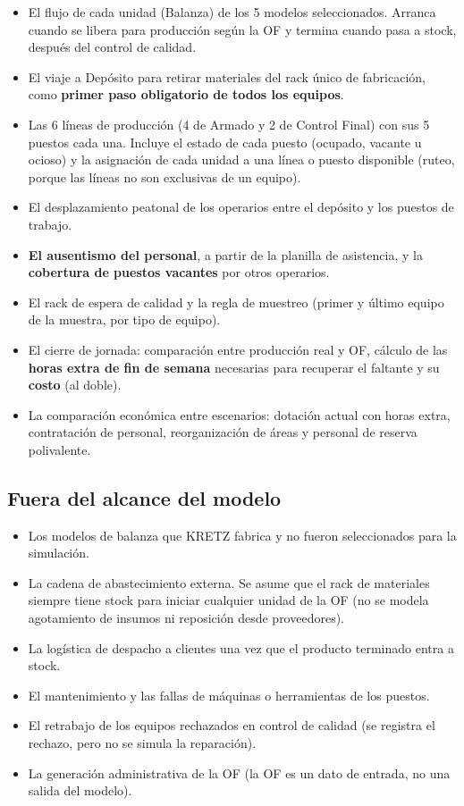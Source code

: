 \documentclass[11pt,a4paper]{article}
\begin{document}
\begin{itemize}
  \item El flujo de cada unidad (Balanza) de los 5 modelos seleccionados. Arranca cuando se libera para producción según la OF y termina cuando pasa a stock, después del control de calidad.
  \item El viaje a Depósito para retirar materiales del rack único de fabricación, como \textbf{primer paso obligatorio de todos los equipos}.
  \item Las 6 líneas de producción (4 de Armado y 2 de Control Final) con sus 5 puestos cada una. Incluye el estado de cada puesto (ocupado, vacante u ocioso) y la asignación de cada unidad a una línea o puesto disponible (ruteo, porque las líneas no son exclusivas de un equipo).
  \item El desplazamiento peatonal de los operarios entre el depósito y los puestos de trabajo.
  \item \textbf{El ausentismo del personal}, a partir de la planilla de asistencia, y la \textbf{cobertura de puestos vacantes} por otros operarios.
  \item El rack de espera de calidad y la regla de muestreo (primer y último equipo de la muestra, por tipo de equipo).
  \item El cierre de jornada: comparación entre producción real y OF, cálculo de las \textbf{horas extra de fin de semana} necesarias para recuperar el faltante y su \textbf{costo} (al doble).
  \item La comparación económica entre escenarios: dotación actual con horas extra, contratación de personal, reorganización de áreas y personal de reserva polivalente.
\end{itemize}

\subsection*{Fuera del alcance del modelo}

\begin{itemize}
  \item Los modelos de balanza que KRETZ fabrica y no fueron seleccionados para la simulación.
  \item La cadena de abastecimiento externa. Se asume que el rack de materiales siempre tiene stock para iniciar cualquier unidad de la OF (no se modela agotamiento de insumos ni reposición desde proveedores).
  \item La logística de despacho a clientes una vez que el producto terminado entra a stock.
  \item El mantenimiento y las fallas de máquinas o herramientas de los puestos.
  \item El retrabajo de los equipos rechazados en control de calidad (se registra el rechazo, pero no se simula la reparación).
  \item La generación administrativa de la OF (la OF es un dato de entrada, no una salida del modelo).
\end{itemize}
\end{document}
